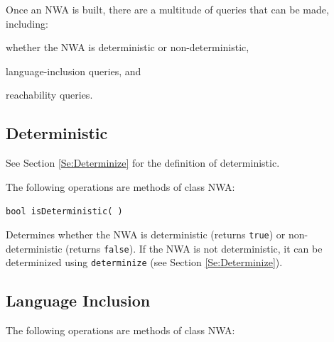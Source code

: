 Once an NWA is built, there are a multitude of queries that can be made,
including: \begin{inparaenum} \item whether the NWA is deterministic or
  non-deterministic, \item language-inclusion queries, and \item reachability
  queries. \end{inparaenum}

\clearpage
\subsection{Deterministic}
\label{Se:Deterministic}

See Section \ref{Se:Determinize} for the definition of deterministic.

\noindent The following operations are methods of class NWA:

\begin{description}

  \item\texttt{bool isDeterministic( )} \nopagebreak

    Determines whether the NWA is deterministic (returns \texttt{true}) or
    non-deterministic (returns \texttt{false}).  If the NWA is not
    deterministic, it can be determinized using \texttt{determinize} (see
    Section \ref{Se:Determinize}). \\

\end{description}

\subsection{Language Inclusion}
\label{Se:Language}

\noindent The following operations are methods of class NWA:

